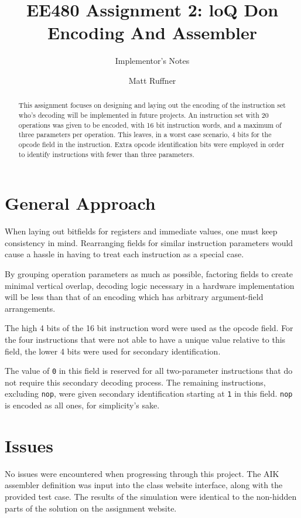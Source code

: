 \documentclass{sig-alternate-05-2015}
\begin{document}

\title{EE480 Assignment 2: loQ Don Encoding And Assembler}
\subtitle{Implementor's Notes}

\author{
Matt Ruffner\\
}

\maketitle
\begin{abstract}
This assignment focuses on designing and laying out the encoding of the instruction set who's decoding will be implemented in future projects. An instruction set with 20 operations was given to be encoded, with 16 bit instruction words, and a maximum of three parameters per operation. This leaves, in a worst case scenario, 4 bits for the opcode field in the instruction. Extra opcode identification bits were employed in order to identify instructions with fewer than three parameters.
\end{abstract}


\section{General Approach}
When laying out bitfields for registers and immediate values, one must keep consistency in mind. Rearranging fields for similar instruction parameters would cause a hassle in having to treat each instruction as a special case. 

By grouping operation parameters as much as possible, factoring fields to create minimal vertical overlap,  decoding logic necessary in a hardware implementation will be less than that of an encoding which has arbitrary argument-field arrangements.

The high 4 bits of the 16 bit instruction word were used as the opcode field. For the four instructions that were not able to have a unique value relative to this field, the lower 4 bits were used for secondary identification. 

The value of \texttt{0} in this field is reserved for all two-parameter instructions that do not require this secondary decoding process. The remaining instructions, excluding \texttt{nop}, were given secondary identification starting at \texttt{1} in this field. \texttt{nop} is encoded as all ones, for simplicity's sake.

\vfill\pagebreak

\section{Issues}
No issues were encountered when progressing through this project. The AIK assembler definition was input into the class website interface, along with the provided test case. The results of the simulation were identical to the non-hidden parts of the solution on the assignment website.
\end{document}
